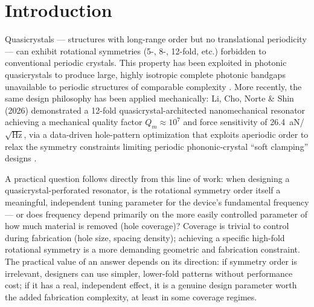 \documentclass[11pt]{article}
\begin{document}
\begin{abstract}
With all three corrected, the answer is that hole coverage and symmetry order both affect the plate's fundamental frequency, but not equally. Coverage is the dominant knob; symmetry order is a real but secondary effect that is undetectable at near-dense coverage and switches on, growing steadily, as more material is removed. I also tested a second, separate quantity --- the bandgap, the empty frequency range between two vibration modes. My first, pre-correction attempt found no symmetry effect on it, and I wrote that up as a point of contrast with the photonic-quasicrystal literature, where symmetry is known to matter; after the corrections, a real trend appeared instead --- higher symmetry, wider gap --- which agrees with that literature rather than contradicting it. In that case the corrections did not just adjust a number, they reversed a conclusion.
\end{abstract}

\section{Introduction}

Quasicrystals --- structures with long-range order but no translational periodicity --- can exhibit rotational symmetries (5-, 8-, 12-fold, etc.) forbidden to conventional periodic crystals. This property has been exploited in photonic quasicrystals to produce large, highly isotropic complete photonic bandgaps unavailable to periodic structures of comparable complexity \cite{florescu2009}. More recently, the same design philosophy has been applied mechanically: Li, Cho, Norte \& Shin (2026) demonstrated a 12-fold quasicrystal-architected nanomechanical resonator achieving a mechanical quality factor $Q_m \approx 10^7$ and force sensitivity of 26.4~aN/$\sqrt{\text{Hz}}$, via a data-driven hole-pattern optimization that exploits aperiodic order to relax the symmetry constraints limiting periodic phononic-crystal ``soft clamping'' designs \cite{li2026}.

A practical question follows directly from this line of work: when designing a quasicrystal-perforated resonator, is the rotational symmetry order itself a meaningful, independent tuning parameter for the device's fundamental frequency --- or does frequency depend primarily on the more easily controlled parameter of how much material is removed (hole coverage)? Coverage is trivial to control during fabrication (hole size, spacing density); achieving a specific high-fold rotational symmetry is a more demanding geometric and fabrication constraint. The practical value of an answer depends on its direction: if symmetry order is irrelevant, designers can use simpler, lower-fold patterns without performance cost; if it has a real, independent effect, it is a genuine design parameter worth the added fabrication complexity, at least in some coverage regimes.
\end{document}
